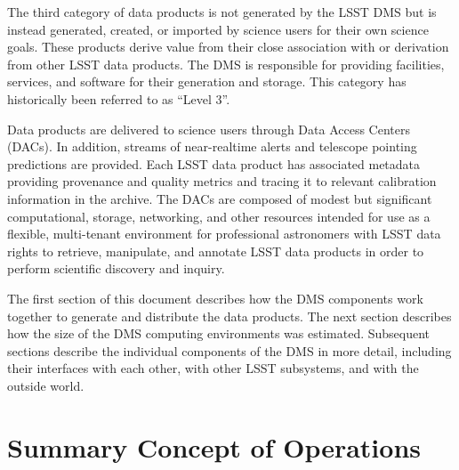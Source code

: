 \documentclass[DM,lsstdraft,toc]{lsstdoc}
\begin{document}
The third category of data products is not generated by the LSST DMS but is
instead generated, created, or imported by science users for their own science
goals. These products derive value from their close association with or
derivation from other LSST data products. The DMS is responsible for providing
facilities, services, and software for their generation and storage.  This
category has historically been referred to as ``Level 3''.

Data products are delivered to science users through Data Access
Centers (DACs). In addition, streams of near-realtime alerts and telescope
pointing predictions are provided.  Each LSST data product has associated
metadata providing provenance and quality metrics and tracing it to relevant
calibration information in the archive. The DACs are composed of modest but
significant computational, storage, networking, and other resources intended
for use as a flexible, multi-tenant environment for professional astronomers
with LSST data rights to retrieve, manipulate, and annotate LSST data products
in order to perform scientific discovery and inquiry.

The first section of this document describes how the DMS components work
together to generate and distribute the data products.  The next section
describes how the size of the DMS computing environments was estimated.
Subsequent sections describe the individual components of the DMS in more
detail, including their interfaces with each other, with other LSST subsystems,
and with the outside world.

\section{Summary Concept of Operations}\label{summary-concept-of-operations}
\end{document}
